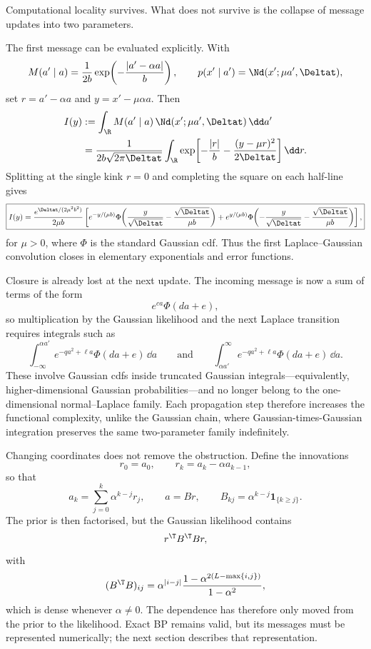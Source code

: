 Computational locality survives. What does not survive is the collapse of message updates into two parameters.

\begin{remark}\label{rmk:l-breakdown}
The first message can be evaluated explicitly. With
\[
M(a'\mid a)
=
\frac{1}{2b}
\exp\!\left(-\frac{|a'-\alpha a|}{b}\right),
\qquad
p(x'\mid a')
=
\Nd(x';\mu a',\Deltat),
\]
set $r=a'-\alpha a$ and $y=x'-\mu\alpha a$. Then
\begin{align}
I(y)
&:=
\int_{\R} M(a'\mid a)\,
        \Nd(x';\mu a',\Deltat)\,\dd a' \\
&=
\frac{1}{2b\sqrt{2\pi\Deltat}}
\int_{\R}
\exp\!\left[
-\frac{|r|}{b}
-\frac{(y-\mu r)^2}{2\Deltat}
\right]\dd r .
\end{align}
Splitting at the single kink $r=0$ and completing the square on each
half-line gives
\begin{equation}
\boxed{
I(y)
=
\frac{e^{\Deltat/(2\mu^2b^2)}}{2\mu b}
\left[
e^{-y/(\mu b)}
\Phi\!\left(
\frac{y}{\sqrt{\Deltat}}
-\frac{\sqrt{\Deltat}}{\mu b}
\right)
+
e^{y/(\mu b)}
\Phi\!\left(
-\frac{y}{\sqrt{\Deltat}}
-\frac{\sqrt{\Deltat}}{\mu b}
\right)
\right],
}
\end{equation}
for $\mu>0$, where $\Phi$ is the standard Gaussian cdf. Thus the first
Laplace--Gaussian convolution closes in elementary exponentials and error
functions.

Closure is already lost at the next update. The incoming message is now a
sum of terms of the form
\[
e^{ca}\Phi(da+e),
\]
so multiplication by the Gaussian likelihood and the next Laplace transition
requires integrals such as
\[
\int_{-\infty}^{\alpha a'}
e^{-q a^2+\ell a}\Phi(da+e)\,\dd a
\qquad\text{and}\qquad
\int_{\alpha a'}^\infty
e^{-q a^2+\ell a}\Phi(da+e)\,\dd a .
\]
These involve Gaussian cdfs inside truncated Gaussian integrals---equivalently,
higher-dimensional Gaussian probabilities---and no longer belong to the
one-dimensional normal--Laplace family. Each propagation step therefore
increases the functional complexity, unlike the Gaussian chain, where
Gaussian-times-Gaussian integration preserves the same two-parameter family
indefinitely.

Changing coordinates does not remove the obstruction. Define the innovations
\[
r_0=a_0,
\qquad
r_k=a_k-\alpha a_{k-1},
\]
so that
\[
a_k=\sum_{j=0}^k \alpha^{k-j}r_j,
\qquad a=Br,
\qquad
B_{kj}=\alpha^{k-j}\mathbf 1_{\{k\ge j\}}.
\]
The prior is then factorised, but the Gaussian likelihood contains
\[
r^\T B^\T B r,
\]
with
\[
(B^\T B)_{ij}
=
\alpha^{|i-j|}
\frac{1-\alpha^{2(L-\max\{i,j\})}}
     {1-\alpha^2},
\]
which is dense whenever $\alpha\neq0$. The dependence has therefore only
moved from the prior to the likelihood. Exact BP remains valid, but its
messages must be represented numerically; the next section describes that
representation.
\end{remark}


